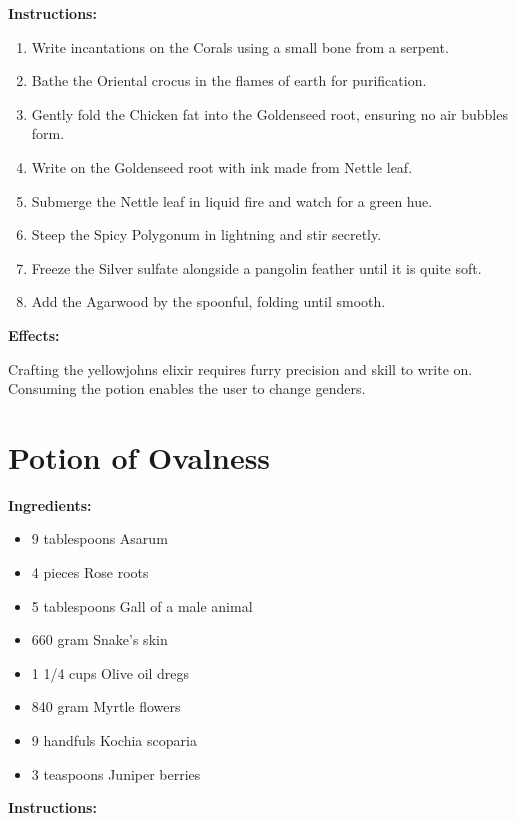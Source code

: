 \documentclass{article}
\begin{document}
\textbf{Instructions:}

\begin{enumerate}
  \item Write incantations on the Corals using a small bone from a serpent.
  \item Bathe the Oriental crocus in the flames of earth for purification.
  \item Gently fold the Chicken fat into the Goldenseed root, ensuring no air bubbles form.
  \item Write on the Goldenseed root with ink made from Nettle leaf.
  \item Submerge the Nettle leaf in liquid fire and watch for a green hue.
  \item Steep the Spicy Polygonum in lightning and stir secretly.
  \item Freeze the Silver sulfate alongside a pangolin feather until it is quite soft.
  \item Add the Agarwood by the spoonful, folding until smooth.
\end{enumerate}

\textbf{Effects:}

Crafting the yellowjohns elixir requires furry precision and skill to write on. Consuming the potion enables the user to change genders.

\newpage
\section*{Potion of Ovalness}

\textbf{Ingredients:}

\begin{itemize}
  \item 9 tablespoons Asarum
  \item 4 pieces Rose roots
  \item 5 tablespoons Gall of a male animal
  \item 660 gram Snake's skin
  \item 1 1/4 cups Olive oil dregs
  \item 840 gram Myrtle flowers
  \item 9 handfuls Kochia scoparia
  \item 3 teaspoons Juniper berries
\end{itemize}

\textbf{Instructions:}
\end{document}
